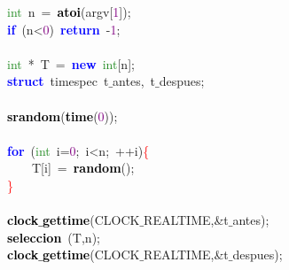 \mbox{}\ \ \ \ \textcolor{ForestGreen}{int}\ n\ \textcolor{BrickRed}{=}\ \textbf{\textcolor{Black}{atoi}}\textcolor{BrickRed}{(}argv\textcolor{BrickRed}{[}\textcolor{Purple}{1}\textcolor{BrickRed}{]);}\ \ \ \  \\
\mbox{}\ \ \ \ \textbf{\textcolor{Blue}{if}}\ \textcolor{BrickRed}{(}n\textcolor{BrickRed}{\textless{}}\textcolor{Purple}{0}\textcolor{BrickRed}{)}\ \textbf{\textcolor{Blue}{return}}\ \textcolor{BrickRed}{-}\textcolor{Purple}{1}\textcolor{BrickRed}{;} \\
\mbox{}\ \ \ \  \\
\mbox{}\ \ \ \ \textcolor{ForestGreen}{int}\ \textcolor{BrickRed}{*}\ T\ \textcolor{BrickRed}{=}\ \textbf{\textcolor{Blue}{new}}\ \textcolor{ForestGreen}{int}\textcolor{BrickRed}{[}n\textcolor{BrickRed}{];} \\
\mbox{}\ \ \ \ \textbf{\textcolor{Blue}{struct}}\ \textcolor{TealBlue}{timespec}\ t$\_$antes\textcolor{BrickRed}{,}\ t$\_$despues\textcolor{BrickRed}{;} \\
\mbox{}\ \ \ \  \\
\mbox{}\ \ \ \ \textbf{\textcolor{Black}{srandom}}\textcolor{BrickRed}{(}\textbf{\textcolor{Black}{time}}\textcolor{BrickRed}{(}\textcolor{Purple}{0}\textcolor{BrickRed}{));} \\
\mbox{}\ \ \ \  \\
\mbox{}\ \ \ \ \textbf{\textcolor{Blue}{for}}\ \textcolor{BrickRed}{(}\textcolor{ForestGreen}{int}\ i\textcolor{BrickRed}{=}\textcolor{Purple}{0}\textcolor{BrickRed}{;}\ i\textcolor{BrickRed}{\textless{}}n\textcolor{BrickRed}{;}\ \textcolor{BrickRed}{++}i\textcolor{BrickRed}{)}\textcolor{Red}{\{} \\
\mbox{}\ \ \ \ \ \ \ \ T\textcolor{BrickRed}{[}i\textcolor{BrickRed}{]}\ \textcolor{BrickRed}{=}\ \textbf{\textcolor{Black}{random}}\textcolor{BrickRed}{();} \\
\mbox{}\ \ \ \ \textcolor{Red}{\}} \\
\mbox{}\ \ \ \  \\
\mbox{}\ \ \ \ \textbf{\textcolor{Black}{clock$\_$gettime}}\textcolor{BrickRed}{(}CLOCK$\_$REALTIME\textcolor{BrickRed}{,\&}t$\_$antes\textcolor{BrickRed}{);} \\
\mbox{}\ \ \ \ \textbf{\textcolor{Black}{seleccion}}\ \textcolor{BrickRed}{(}T\textcolor{BrickRed}{,}n\textcolor{BrickRed}{);} \\
\mbox{}\ \ \ \ \textbf{\textcolor{Black}{clock$\_$gettime}}\textcolor{BrickRed}{(}CLOCK$\_$REALTIME\textcolor{BrickRed}{,\&}t$\_$despues\textcolor{BrickRed}{);} \\
